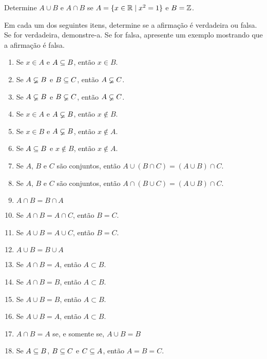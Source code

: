 \documentclass[12pt]{exam}
\begin{document}
    \vspace{.3cm}

    \questao{} Determine $A \cup B$ e $A \cap B$ se $A = \{x \in \mathbb{R} \mid x^2 = 1\}$ e $B = \mathbb{Z}$.

    \vspace{.3cm}

    \questao{} Em cada um dos seguintes itens, determine se a afirmação é
    verdadeira ou falsa. Se for verdadeira, demonstre-a. Se for falsa, apresente um exemplo mostrando que a afirmação é falsa.
    \begin{enumerate}[label={\alph*})]
        \item Se $x \in A$ e $A \subseteq B$, então $x \in B$.

        \item Se $A \varsubsetneq B$ e $B \subseteq C$, então $A \varsubsetneq C$.

        \item Se $A \varsubsetneq B$ e $B \varsubsetneq C$, então $A \varsubsetneq C$.

        \item Se $x \in A$ e $A \varsubsetneq B$, então $x \notin B$.

        \item Se $x \in B$ e $A \varsubsetneq B$, então $x \notin A$.

        \item Se $A \subseteq B$ e $x \notin B$, então $x \notin A$.

        \item Se $A$, $B$ e $C$ são conjuntos, então $A \cup (B \cap C) = (A \cup B) \cap C$.

        \item Se $A$, $B$ e $C$ são conjuntos, então $A \cap (B \cup C) = (A \cup B) \cap C$.

        \item $A \cap B = B \cap A$

        \item Se $A \cap B = A \cap C$, então $B = C$.

        \item Se $A \cup B = A \cup C$, então $B = C$.

        \item $A \cup B = B \cup A$

        \item Se $A \cap B = A$, então $A \subset B$.

        \item Se $A \cap B = B$, então $A \subset B$.

        \item Se $A \cup B = B$, então $A \subset B$.

        \item Se $A \cup B = A$, então $A \subset B$.

        \item $A \cap B = A$ se, e somente se, $A \cup B = B$

        \item Se $A \subseteq B$, $B \subseteq C$ e $C \subseteq A$, então $A = B = C$.
    \end{enumerate}
\end{document}
